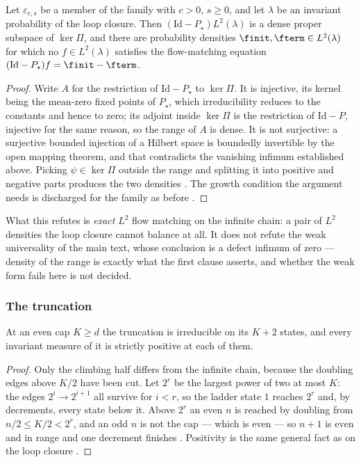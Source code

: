 \begin{theorem}
  \label{thm:main_unsolvable}
Let $\varepsilon_{c,s}$ be a member of the family with $c>0$, $s\geq0$, and let $\lambda$ be an
invariant probability of the loop closure. Then $(\mathrm{Id}-P_\star)L^2(\lambda)$ is a dense
proper subspace of $\ker\Pi$, and there are probability densities
$\finit,\fterm\in L^2(\lambda)$ for which no $f\in L^2(\lambda)$ satisfies the flow-matching
equation $(\mathrm{Id}-P_\star)f=\finit-\fterm$.
\end{theorem}

\begin{proof}
Write $A$ for the restriction of $\mathrm{Id}-P_\star$ to $\ker\Pi$. It is injective, its
kernel being the mean-zero fixed points of $P_\star$, which irreducibility reduces to the
constants and hence to zero; its adjoint inside $\ker\Pi$ is the restriction of
$\mathrm{Id}-P$, injective for the same reason, so the range of $A$ is dense. It is not
surjective: a surjective bounded injection of a Hilbert space is boundedly invertible by the
open mapping theorem, and that contradicts the vanishing infimum established above. Picking
$\psi\in\ker\Pi$ outside the range and splitting it into positive and negative parts produces
the two densities . The growth condition the argument
needs is discharged for the family as before
.
\end{proof}

\noindent What this refutes is \emph{exact} $L^2$ flow matching on the infinite chain: a pair of $L^2$
densities the loop closure cannot balance at all. It does not refute the weak universality of
the main text, whose conclusion is a defect infimum of zero --- density of the range is exactly
what the first clause asserts, and whether the weak form fails here is not decided.


\subsubsection{The truncation}


\begin{theorem}
  \label{thm:main_truncation_irreducible}
At an even cap $K\geq d$ the truncation is irreducible on its $K+2$ states, and every invariant
measure of it is strictly positive at each of them.
\end{theorem}

\begin{proof}
Only the climbing half differs from the infinite chain, because the doubling edges above $K/2$
have been cut. Let $2^{r}$ be the largest power of two at most $K$: the edges
$2^{i}\rightarrow2^{i+1}$ all survive for $i<r$, so the ladder state $1$ reaches $2^{r}$ and,
by decrements, every state below it. Above $2^{r}$ an even $n$ is reached by doubling from
$n/2\leq K/2<2^{r}$, and an odd $n$ is not the cap --- which is even --- so $n+1$ is even and
in range and one decrement finishes . Positivity is the
same general fact as on the loop closure
.
\end{proof}

